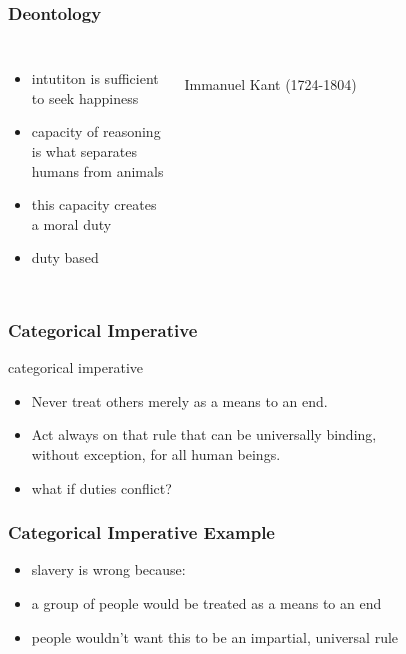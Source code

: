 \documentclass[dvipsnames]{beamer}
\theoremstyle{plain}
\begin{document}
\begin{frame}
  \frametitle{Deontology}

  \begin{columns}
    \begin{itemize}
      \item intutiton is sufficient\\
        to seek happiness
      \item capacity of reasoning\\
        is what separates\\
        humans from animals
      \item this capacity creates\\
        a moral duty

      \medskip
      \item duty based
    \end{itemize}

    \begin{center}
      \\
      Immanuel Kant (1724-1804)
    \end{center}
  \end{columns}
\end{frame}

\begin{frame}
  \frametitle{Categorical Imperative}

  \begin{block}{categorical imperative}
    \begin{itemize}
      \item Never treat others merely as a means to an end.
      \item Act always on that rule that can be universally binding,\\
        without exception, for all human beings.
    \end{itemize}
  \end{block}

  \pause
  \begin{itemize}
    \item what if duties conflict?
  \end{itemize}
\end{frame}

\begin{frame}
  \frametitle{Categorical Imperative Example}

  \begin{itemize}
    \item slavery is wrong because:

    \medskip
    \item a group of people would be treated as a means to an end
    \item people wouldn't want this to be an impartial, universal rule
  \end{itemize}
\end{frame}
\end{document}
